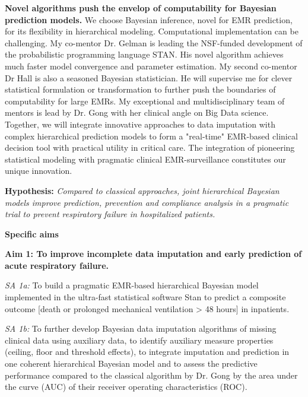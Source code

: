 \documentclass[11pt,notitlepage]{article}
\begin{document}
\textbf{Novel algorithms push the envelop of computability for Bayesian prediction models.} We choose Bayesian inference, novel for EMR prediction, for its flexibility in hierarchical modeling. Computational implementation can be challenging. My co-mentor Dr. Gelman is leading the NSF-funded development of the probabilistic programming language STAN. His novel algorithm achieves much faster model convergence and parameter estimation. My second co-mentor Dr Hall is also a seasoned Bayesian statistician. He will supervise me for clever statistical formulation or transformation to further push the boundaries of computability for large EMRs. My exceptional and multidisciplinary team of mentors is lead by Dr. Gong with her clinical angle on Big Data science. Together, we will integrate innovative approaches to data imputation with complex hierarchical prediction models to form a "real-time" EMR-based clinical decision tool with practical utility in critical care.  The integration of pioneering statistical modeling with pragmatic clinical EMR-surveillance constitutes our unique innovation.
\vspace{-5pt}
\begin{flushleft}
\textbf{Hypothesis:} \textit{Compared to classical approaches, joint hierarchical Bayesian models improve prediction, prevention and compliance analysis in a pragmatic trial to prevent respiratory failure in hospitalized patients.}
\end{flushleft}
\vspace{-5pt}
\textbf{Specific aims}
\vspace{-5pt}
\begin{flushleft}
\textbf{Aim 1: To improve incomplete data imputation and early prediction of acute respiratory failure.}
\end{flushleft}
\vspace{-8pt}

\textit{SA 1a:} To build a pragmatic EMR-based hierarchical Bayesian model implemented in the ultra-fast statistical software Stan to predict a composite outcome [death or prolonged mechanical ventilation > 48 hours] in inpatients.

\textit{SA 1b:} To further develop Bayesian data imputation algorithms of missing clinical data using auxiliary data, to identify auxiliary measure properties (ceiling, floor and threshold effects), to integrate imputation and prediction in one coherent hierarchical Bayesian model and to assess the  predictive performance  compared to the classical algorithm by Dr. Gong by the area under the curve (AUC) of their receiver operating characteristics (ROC).
\end{document}
